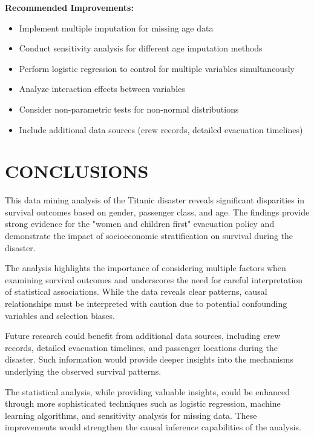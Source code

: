 \documentclass[letterpaper, 10 pt, conference]{ieeeconf}  %
\begin{document}
\textbf{Recommended Improvements:}
\begin{itemize}
\item Implement multiple imputation for missing age data
\item Conduct sensitivity analysis for different age imputation methods
\item Perform logistic regression to control for multiple variables simultaneously
\item Analyze interaction effects between variables
\item Consider non-parametric tests for non-normal distributions
\item Include additional data sources (crew records, detailed evacuation timelines)
\end{itemize}

\section{CONCLUSIONS}

This data mining analysis of the Titanic disaster reveals significant disparities in survival outcomes based on gender, passenger class, and age. The findings provide strong evidence for the "women and children first" evacuation policy and demonstrate the impact of socioeconomic stratification on survival during the disaster.

The analysis highlights the importance of considering multiple factors when examining survival outcomes and underscores the need for careful interpretation of statistical associations. While the data reveals clear patterns, causal relationships must be interpreted with caution due to potential confounding variables and selection biases.

Future research could benefit from additional data sources, including crew records, detailed evacuation timelines, and passenger locations during the disaster. Such information would provide deeper insights into the mechanisms underlying the observed survival patterns.

The statistical analysis, while providing valuable insights, could be enhanced through more sophisticated techniques such as logistic regression, machine learning algorithms, and sensitivity analysis for missing data. These improvements would strengthen the causal inference capabilities of the analysis.

\addtolength{\textheight}{-12cm}   %
\end{document}
